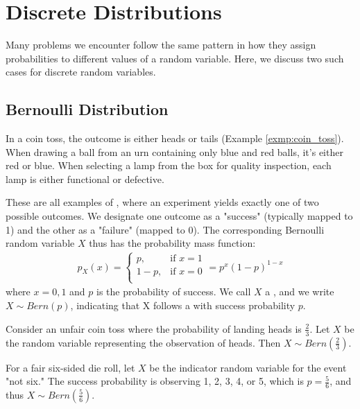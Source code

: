 \section{Discrete Distributions}

Many problems we encounter follow the same pattern in how they assign probabilities to different values of a random variable.
Here, we discuss two such cases for discrete random variables.

\subsection{Bernoulli Distribution}

In a coin toss, the outcome is either heads or tails (Example \autoref{exmp:coin_toss}).
When drawing a ball from an urn containing only blue and red balls, it's either red or blue.
When selecting a lamp from the box for quality inspection, each lamp is either functional or defective.

These are all examples of , where an experiment yields exactly one of two possible outcomes.
We designate one outcome as a "success" (typically mapped to 1) and the other as a "failure" (mapped to 0).
The corresponding Bernoulli random variable \( X \) thus has the probability mass function:
\begin{gather*}
    p_{X}(x) = \begin{cases}
        p, & \text{if } x = 1\\
        1 - p, & \text{if } x = 0\\
    \end{cases}
    = p^x(1 - p)^{1 - x}
\end{gather*}
where \( x = 0, 1 \) and \( p \) is the probability of success.
We call \( X \) a , and we write \( X \sim Bern(p) \), indicating that X follows a  with success probability \( p \).
\begin{exmp}
    Consider an unfair coin toss where the probability of landing heads is \( \frac{2}{3} \).
    Let \( X \) be the random variable representing the observation of heads. Then \( X \sim Bern(\frac{2}{3}) \).
\end{exmp}
\begin{exmp}
    For a fair six-sided die roll, let \( X \) be the indicator random variable for the event "not six."
    The success probability is observing 1, 2, 3, 4, or 5,
    which is \( p = \frac{5}{6} \),
    and thus \( X \sim Bern(\frac{5}{6}) \).
\end{exmp}

